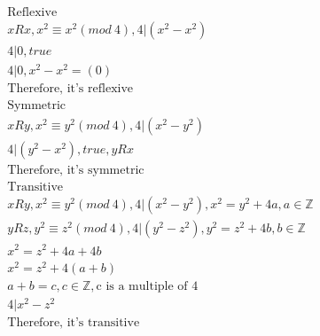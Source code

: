 \documentclass[12pt]{article}
\begin{document}
\begin{enumerate}
\begin{equation*}
\begin{split}
		    \text{Reflexive}\\
		    xRx, x^2 \equiv x^2 (mod\ 4), 4|(x^2-x^2)\\
		    4|0, true\\
		    4|0, x^2 -x^2 = (0)\\
		    \text{Therefore, it's reflexive}\\ 
		    \text{Symmetric}\\
		    xRy, x^2 \equiv y^2 (mod\ 4), 4|(x^2-y^2)\\
		    4|(y^2 - x^2), true, yRx\\
		    \text{Therefore, it's symmetric}\\ 
		    \text{Transitive}\\
		    xRy, x^2 \equiv y^2 (mod\ 4), 4|(x^2-y^2), x^2 = y^2 + 4a, a \in \mathbb{Z}\\
		    yRz, y^2 \equiv z^2 (mod\ 4), 4|(y^2-z^2), y^2 = z^2 + 4b, b \in \mathbb{Z}\\
		    x^2 = z^2 + 4a + 4b\\
		    x^2 = z^2 + 4(a+b)\\
		    a+b = c, c \in \mathbb{Z}, \text{c is a multiple of 4}\\
		    4|x^2 -z^2\\
		    \text{Therefore, it's transitive}
	    	\end{split}
	    \end{equation*}
\end{enumerate}
\end{document}
